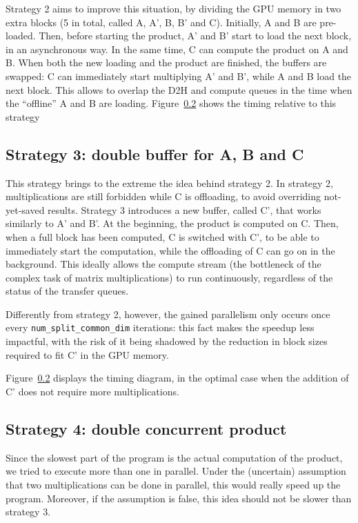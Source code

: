 Strategy 2 aims to improve this situation, by dividing the GPU memory in two extra blocks (5 in total, called A, A', B, B' and C).
Initially, A and B are pre-loaded.
Then, before starting the product, A' and B' start to load the next block, in an asynchronous way.
In the same time, C can compute the product on A and B.
When both the new loading and the product are finished, the buffers are swapped: C can immediately start multiplying A' and B', while A and B load the next block.
This allows to overlap the D2H and compute queues in the time when the ``offline'' A and B are loading.
Figure~\ref{} shows the timing relative to this strategy

\subsection{Strategy 3: double buffer for A, B and C}

This strategy brings to the extreme the idea behind strategy 2.
In strategy 2, multiplications are still forbidden while C is offloading, to avoid overriding not-yet-saved results.
Strategy 3 introduces a new buffer, called C', that works similarly to A' and B'.
At the beginning, the product is computed on C.
Then, when a full block has been computed, C is switched with C', to be able to immediately start the computation, while the offloading of C can go on in the background.
This ideally allows the compute stream (the bottleneck of the complex task of matrix multiplications) to run continuously, regardless of the status of the transfer queues.

Differently from strategy 2, however, the gained parallelism only occurs once every \texttt{num\_split\_common\_dim} iterations: this fact makes the speedup less impactful, with the risk of it being shadowed by the reduction in block sizes required to fit C' in the GPU memory.

Figure~\ref{} displays the timing diagram, in the optimal case when the addition of C' does not require more multiplications.

\subsection{Strategy 4: double concurrent product}

Since the slowest part of the program is the actual computation of the product, we tried to execute more than one in parallel.
Under the (uncertain) assumption that two multiplications can be done in parallel, this would really speed up the program.
Moreover, if the assumption is false, this idea should not be slower than strategy 3.

